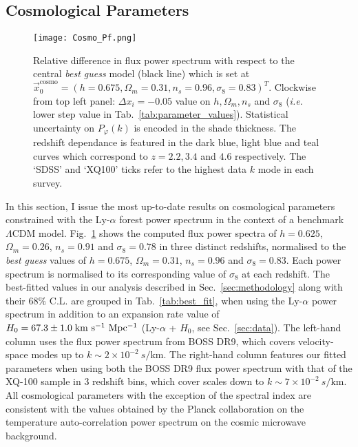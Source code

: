 \vspace*{1.5pc}


\subsection{Cosmological Parameters}

\begin{figure}
\begin{center}
\texttt{[image: Cosmo\_Pf.png]}
\caption{Relative difference in flux power spectrum with respect to the central \textit{best guess} model (black line) which is set at $\vec{x}_0^{\mathrm{cosmo}} = \left( h = 0.675, \Omega_m = 0.31, n_s = 0.96, \sigma_8 = 0.83 \right)^T$. Clockwise from top left panel: $\Delta x_i = -0.05$ value on $h, \Omega_m, n_s$ and $\sigma_8$ (\textit{i.e.} lower step value in Tab.~\ref{tab:parameter_values}). Statistical uncertainty on $P_\varphi (k)$ is encoded in the shade thickness. The redshift dependance is featured in the dark blue, light blue and teal curves which correspond to $z=2.2, 3.4$ and $4.6$ respectively. The `SDSS' and `XQ100' ticks refer to the highest data $k$ mode in each survey.}
\label{fig:Cosmo_flux}
\end{center}
\end{figure}


In this section, I issue the most up-to-date results on cosmological parameters constrained with the Ly-$\alpha$ forest power spectrum in the context of a benchmark $\Lambda$CDM model. Fig.~\ref{fig:Cosmo_flux} shows the computed flux power spectra of $h=0.625$, $\Omega_m=0.26$, $n_s=0.91$ and $\sigma_8=0.78$ in three distinct redshifts, normalised to the \emph{best guess} values of $h=0.675$, $\Omega_m=0.31$, $n_s=0.96$ and $\sigma_8=0.83$. Each power spectrum is normalised to its corresponding value of $\sigma_8$ at each redshift. The best-fitted values in our analysis described in Sec.~\ref{sec:methodology} along with their $68\%$ C.L.  are grouped in Tab.~\ref{tab:best_fit}, when using the Ly-$\alpha$ power spectrum in addition to an expansion rate value of $H_0 = 67.3 \pm 1.0 \; \rm{km~s^{-1}~Mpc^{-1}}$ (Ly-$\alpha$ + $H_0$, see Sec.~\ref{sec:data}). The left-hand column uses the flux power spectrum from BOSS DR9, which covers velocity-space modes up to $k \sim 2 \times 10^{-2}~s/\mathrm{km}$. The right-hand column features our fitted parameters when using both the BOSS DR9 flux power spectrum with that of the XQ-100 sample in 3 redshift bins, which cover scales down to $k \sim 7 \times 10^{-2}~s/\mathrm{km}$. All cosmological parameters with the exception of the spectral index are consistent with the values obtained by the Planck collaboration on the temperature auto-correlation power spectrum on the cosmic microwave background. \\


